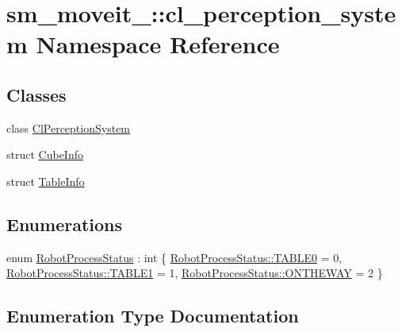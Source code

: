 \hypertarget{namespacesm__moveit__4_1_1cl__perception__system}{}\section{sm\+\_\+moveit\+\_\+:\+:cl\+\_\+perception\+\_\+system Namespace Reference}
\label{namespacesm__moveit__4_1_1cl__perception__system}
\subsection*{Classes}
\begin{DoxyCompactItemize}
\item 
class \hyperlink{classsm__moveit__4_1_1cl__perception__system_1_1ClPerceptionSystem}{Cl\+Perception\+System}
\item 
struct \hyperlink{structsm__moveit__4_1_1cl__perception__system_1_1CubeInfo}{Cube\+Info}
\item 
struct \hyperlink{structsm__moveit__4_1_1cl__perception__system_1_1TableInfo}{Table\+Info}
\end{DoxyCompactItemize}
\subsection*{Enumerations}
\begin{DoxyCompactItemize}
\item 
enum \hyperlink{namespacesm__moveit__4_1_1cl__perception__system_a11dfa58fc66f2d368b894a9f1fec870e}{Robot\+Process\+Status} \+: int \{ \hyperlink{namespacesm__moveit__4_1_1cl__perception__system_a11dfa58fc66f2d368b894a9f1fec870ea1fd65c0ced0ead229bf6dd6a59067a4f}{Robot\+Process\+Status\+::\+T\+A\+B\+L\+E0} = 0, 
\hyperlink{namespacesm__moveit__4_1_1cl__perception__system_a11dfa58fc66f2d368b894a9f1fec870ea5b22e42e5d94a94037a4486a4976c49d}{Robot\+Process\+Status\+::\+T\+A\+B\+L\+E1} = 1, 
\hyperlink{namespacesm__moveit__4_1_1cl__perception__system_a11dfa58fc66f2d368b894a9f1fec870ea92f7ea3097b3fdb1b7a25669cfc1b8bd}{Robot\+Process\+Status\+::\+O\+N\+T\+H\+E\+W\+AY} = 2
 \}
\end{DoxyCompactItemize}


\subsection{Enumeration Type Documentation}
\mbox{\label{namespacesm__moveit__4_1_1cl__perception__system_a11dfa58fc66f2d368b894a9f1fec870e}} 
